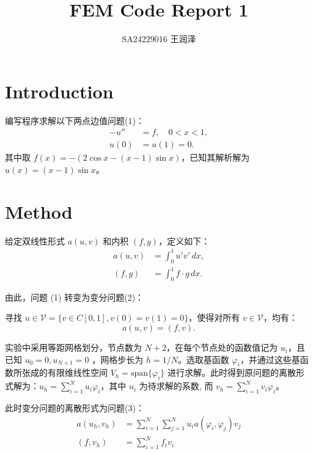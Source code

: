 \documentclass[11pt]{ctexart}
\title{FEM Code Report 1}
\author{SA24229016 王润泽}
\begin{document}
\maketitle

\section{Introduction}
	编写程序求解以下两点边值问题(1)：
	\begin{equation}
		\begin{aligned}
			-u'' &= f, \quad 0 < x < 1, \\
			u(0) &= u(1) = 0.
		\end{aligned}
	\end{equation}
	其中取 $ f(x) = -(2\cos{x}-(x-1)\sin{x}) $，已知其解析解为 $ u(x) = (x-1)\sin{x} $。
\section{Method}

	给定双线性形式 $a(u,v)$ 和内积 $(f, g)$，定义如下：
	\begin{equation*}
		\begin{aligned}
			a(u,v) &= \int_0^1 u' v' \, dx, \\
			(f, g) &= \int_0^1 f \cdot g \, dx.
		\end{aligned}
	\end{equation*}

	由此，问题 (1) 转变为变分问题(2)：

	寻找 $u \in \mathcal{V} = \{v \in C[0,1], v(0) = v(1) = 0\}$，使得对所有 $v \in \mathcal{V} $，均有：
	\begin{equation}
		a(u,v) = (f,v).
	\end{equation}

	实验中采用等距网格划分，节点数为 $N+2$，在每个节点处的函数值记为 $u_i$，且已知 $ u_0 = 0, u_{N+1} = 0 $  ，网格步长为 $h = 1/N$。选取基函数 $\varphi_i$，并通过这些基函数所张成的有限维线性空间 $ V_h=\text{span}\{\varphi_i\} $ 进行求解。此时得到原问题的离散形式解为：$ u_h = \sum_{i=1}^{N} u_i \varphi_i $，其中 $u_i$ 为待求解的系数, 而 $ v_h = \sum_{i=1}^{N} v_i \varphi_i $。 

	此时变分问题的离散形式为问题(3)：	
	\begin{equation}
		\begin{aligned}
			a(u_h, v_h) &= \sum_{i=1}^{N} \sum_{j=1}^{N} u_i a(\varphi_i, \varphi_j) v_j \\
			(f, v_h) &= \sum_{i=1}^{N} f_i v_i
		\end{aligned}
		\label{eq:discrete}
	\end{equation}
	
\end{document}
